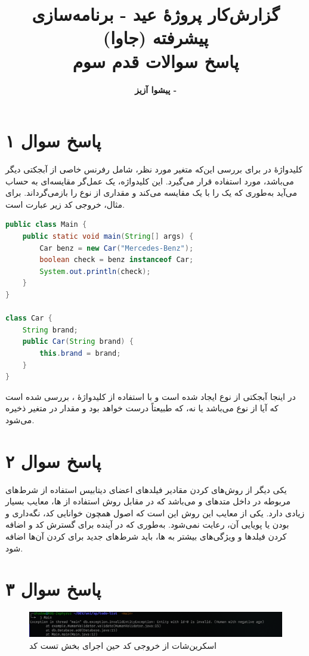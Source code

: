 \documentclass{article}
\title{\textbf{گزارش‌کار پروژۀ عید - برنامه‌سازی پیشرفته (جاوا)}\vspace{1cm}\\پاسخ سوالات قدم سوم}
\author{\textbf{پیشوا آزیز - \lr{40313003}}}
\date{}
\begin{document}
\maketitle

\vspace{2cm}

\section*{پاسخ سوال ۱}
کلیدواژهٔ  در  برای بررسی این‌که متغیر  مورد نظر، شامل رفرنس خاصی از آبجکتی دیگر می‌باشد، مورد استفاده قرار می‌گیرد.
این کلیدواژه، یک عمل‌گر مقایسه‌ای به حساب می‌آید به‌طوری که یک  را با یک  مقایسه می‌کند و مقداری از نوع  را بازمی‌گرداند. برای مثال، خروجی کد زیر عبارت  است.

\begin{latin}
\begin{lstlisting}[language=Java]
public class Main {
    public static void main(String[] args) {
        Car benz = new Car("Mercedes-Benz");
        boolean check = benz instanceof Car;
        System.out.println(check);
    }
}

class Car {
    String brand;
    public Car(String brand) {
        this.brand = brand;
    }
}

\end{lstlisting}
\end{latin}

در اینجا آبجکتی از نوع  ایجاد شده است و با استفاده از کلیدواژهٔ ، بررسی شده است که آیا از نوع  می‌باشد یا نه، که طبیعتاً درست خواهد بود و مقدار  در متغیر  ذخیره می‌شود.

\section*{پاسخ سوال ۲}
یکی دیگر از روش‌های  کردن مقادیر فیلدهای اعضای دیتابیس استفاده از شرط‌های مربوطه در داخل متدهای  و  می‌باشد که در مقابل روش استفاده از ها، معایب بسیار زیادی دارد. یکی از معایب این روش این است که اصول  همچون خوانایی کد، نگه‌داری و  بودن یا پویایی آن، رعایت نمی‌شود. به‌طوری که در آینده برای گسترش کد و اضافه کردن فیلدها و ویژگی‌های بیشتر به ها، باید شرط‌های جدید برای  کردن آن‌ها اضافه شود.

\section*{پاسخ سوال ۳}

\begin{figure}[h]
    \centering
    \includegraphics[width=1\textwidth]{../img/screenshot2.png}
    \caption*{اسکرین‌شات از خروجی کد حین اجرای بخش تست کد}
\end{figure}
\end{document}
